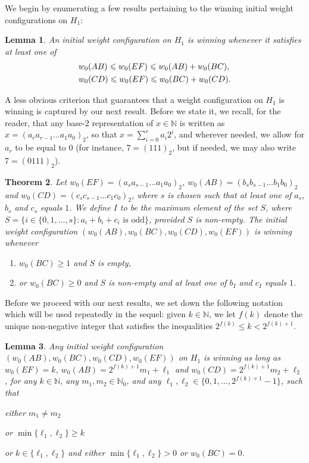 \documentclass[11pt,reqno]{amsart}
\newtheorem{theorem}{Theorem}[section]
\newtheorem{lemma}[theorem]{Lemma}
\theoremstyle{definition}
\theoremstyle{definition}
\begin{document}
We begin by enumerating a few results pertaining to the winning initial weight configurations on $H_{1}$:
\begin{lemma}\label{lem:H_{1}_winning_1}
An initial weight configuration on $H_{1}$ is winning whenever it satisfies at least one of 
\begin{align}
{}&w_{0}(AB)\leqslant w_{0}(EF)\leqslant w_{0}(AB)+w_{0}(BC),\label{eq:H_{1}_winning_1}\\
{}&w_{0}(CD)\leqslant w_{0}(EF)\leqslant w_{0}(BC)+w_{0}(CD).\label{eq:H_{1}_winning_2}
\end{align}
\end{lemma}
A less obvious criterion that guarantees that a weight configuration on $H_{1}$ is winning is captured by our next result. Before we state it, we recall, for the reader, that any base-$2$ representation of $x \in \mathbb{N}$ is written as $x=(a_{r}a_{r-1}\ldots a_{1}a_{0})_{2}$, so that $x=\sum_{i=0}^{r}a_{i}2^{i}$, and wherever needed, we allow for $a_{r}$ to be equal to $0$ (for instance, $7=(111)_{2}$, but if needed, we may also write $7=(0111)_{2}$).
\begin{theorem}\label{thm:H_{1}_winning_1}
Let $w_{0}(EF)=(a_{s}a_{s-1}\ldots a_{1}a_{0})_{2}$, $w_{0}(AB)=(b_{s}b_{s-1}\ldots b_{1}b_{0})_{2}$ and $w_{0}(CD)=(c_{s}c_{s-1}\ldots c_{1}c_{0})_{2}$, where $s$ is chosen such that at least one of $a_{s}$, $b_{s}$ and $c_{s}$ equals $1$. We define $I$ to be the maximum element of the set $S$, where $S=\{i \in \{0,1,\ldots,s\}:a_{i}+b_{i}+c_{i} \text{ is odd}\}$, provided $S$ is non-empty. The initial weight configuration $(w_{0}(AB),w_{0}(BC),w_{0}(CD),w_{0}(EF))$ is winning whenever 
\begin{enumerate}[label=(B\arabic*), ref=B\arabic*]
\item $w_{0}(BC)\geqslant 1$ and $S$ is empty, 
\item \label{A2} or $w_{0}(BC) \geqslant 0$ and $S$ is non-empty and at least one of $b_{I}$ and $c_{I}$ equals $1$.
\end{enumerate}
\end{theorem}
Before we proceed with our next results, we set down the following notation which will be used repeatedly in the sequel: given $k \in \mathbb{N}$, we let $f(k)$ denote the unique non-negative integer that satisfies the inequalities $2^{f(k)}\leqslant k < 2^{f(k)+1}$. 
\begin{lemma}\label{prop:H_{1}_winning_1}
Any initial weight configuration $(w_{0}(AB),w_{0}(BC),w_{0}(CD),w_{0}(EF))$ on $H_{1}$ is winning as long as $w_{0}(EF)=k$, $w_{0}(AB)=2^{f(k)+1}m_{1}+\ell_{1}$ and $w_{0}(CD)=2^{f(k)+1}m_{2}+\ell_{2}$, for any $k \in \mathbb{N}$, any $m_{1}, m_{2} \in \mathbb{N}_{0}$, and any $\ell_{1}, \ell_{2} \in \{0,1,\ldots,2^{f(k)+1}-1\}$, such that 
\begin{enumerate*}
\item either $m_{1}\neq m_{2}$ 
\item or $\min\{\ell_{1},\ell_{2}\} \geqslant k$ 
\item or $k \in \{\ell_{1},\ell_{2}\}$ and either $\min\{\ell_{1},\ell_{2}\}>0$ or $w_{0}(BC)=0$. 
\end{enumerate*}
\end{lemma}
\end{document}
